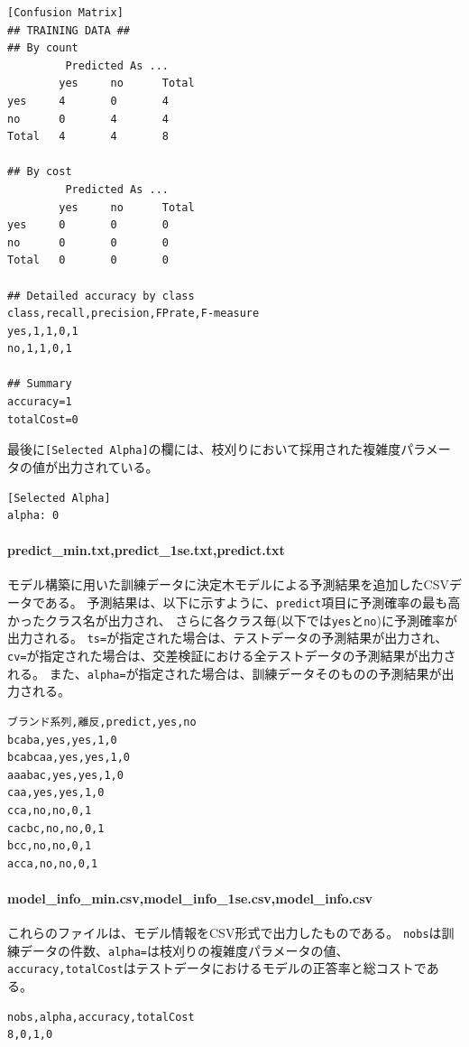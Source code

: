 \begin{Verbatim}[baselinestretch=0.7,frame=single]
[Confusion Matrix]
## TRAINING DATA ##
## By count
         Predicted As ...
        yes     no      Total
yes     4       0       4
no      0       4       4
Total   4       4       8

## By cost
         Predicted As ...
        yes     no      Total
yes     0       0       0
no      0       0       0
Total   0       0       0

## Detailed accuracy by class
class,recall,precision,FPrate,F-measure
yes,1,1,0,1
no,1,1,0,1

## Summary
accuracy=1
totalCost=0
\end{Verbatim}

最後に\verb|[Selected Alpha]|の欄には、枝刈りにおいて採用された複雑度パラメータの値が出力されている。
\begin{Verbatim}[baselinestretch=0.7,frame=single]
[Selected Alpha]
alpha: 0
\end{Verbatim}


\paragraph{predict\_min.txt,predict\_1se.txt,predict.txt}
モデル構築に用いた訓練データに決定木モデルによる予測結果を追加したCSVデータである。
予測結果は、以下に示すように、\verb|predict|項目に予測確率の最も高かったクラス名が出力され、
さらに各クラス毎(以下では\verb|yes|と\verb|no|)に予測確率が出力される。
\verb|ts=|が指定された場合は、テストデータの予測結果が出力され、
\verb|cv=|が指定された場合は、交差検証における全テストデータの予測結果が出力される。
また、\verb|alpha=|が指定された場合は、訓練データそのものの予測結果が出力される。

\begin{Verbatim}[baselinestretch=0.7,frame=single]
ブランド系列,離反,predict,yes,no
bcaba,yes,yes,1,0
bcabcaa,yes,yes,1,0
aaabac,yes,yes,1,0
caa,yes,yes,1,0
cca,no,no,0,1
cacbc,no,no,0,1
bcc,no,no,0,1
acca,no,no,0,1
\end{Verbatim}

\paragraph{model\_info\_min.csv,model\_info\_1se.csv,model\_info.csv}
これらのファイルは、モデル情報をCSV形式で出力したものである。
\verb|nobs|は訓練データの件数、\verb|alpha=|は枝刈りの複雑度パラメータの値、
\verb|accuracy,totalCost|はテストデータにおけるモデルの正答率と総コストである。
\begin{Verbatim}[baselinestretch=0.7,frame=single]
nobs,alpha,accuracy,totalCost
8,0,1,0
\end{Verbatim}

